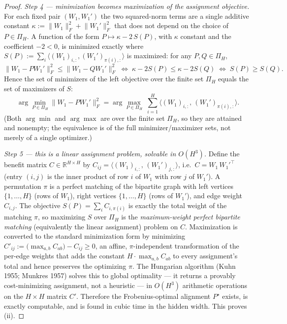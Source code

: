 \documentclass[11pt]{article}
\theoremstyle{definition}
\theoremstyle{remark}
\begin{document}
\begin{proof}
\emph{Step 4 --- minimization becomes maximization of the assignment objective.}
For each fixed pair $(W_1,W_1')$ the two squared-norm terms are a single additive constant
$\kappa:=\lVert W_1\rVert_F^2 + \lVert W_1'\rVert_F^2$ that does not depend on the choice of
$P\in\Pi_H$. A function of the form $P\mapsto \kappa - 2\,S(P)$, with $\kappa$ constant and the
coefficient $-2<0$, is minimized exactly where $S(P):=\sum_i\langle (W_1)_{i,:},(W_1')_{\pi(i),:}
\rangle$ is maximized: for any $P,Q\in\Pi_H$,
\[
\bigl\lVert W_1 - P W_1'\bigr\rVert_F^2 \le \bigl\lVert W_1 - Q W_1'\bigr\rVert_F^2
\;\Longleftrightarrow\;
\kappa - 2S(P)\le \kappa - 2S(Q)
\;\Longleftrightarrow\;
S(P)\ge S(Q).
\]
Hence the set of minimizers of the left objective over the finite set $\Pi_H$ equals the set of
maximizers of $S$:
\[
\arg\min_{P\in\Pi_H}\bigl\lVert W_1 - P W_1'\bigr\rVert_F^2
=\arg\max_{P\in\Pi_H}\;\sum_{i=1}^{H}\bigl\langle (W_1)_{i,:},\,(W_1')_{\pi(i),:}\bigr\rangle .
\]
(Both $\arg\min$ and $\arg\max$ are over the finite set $\Pi_H$, so they are attained and nonempty;
the equivalence is of the full minimizer/maximizer sets, not merely of a single optimizer.)

\emph{Step 5 --- this is a linear assignment problem, solvable in $O(H^3)$.}
Define the benefit matrix $C\in\mathbb{R}^{H\times H}$ by
$C_{ij}=\langle (W_1)_{i,:},\,(W_1')_{j,:}\rangle$, i.e.\ $C=W_1\,W_1'^{\top}$ (entry $(i,j)$ is the
inner product of row $i$ of $W_1$ with row $j$ of $W_1'$). A permutation $\pi$ is a perfect matching
of the bipartite graph with left vertices $\{1,\dots,H\}$ (rows of $W_1$), right vertices
$\{1,\dots,H\}$ (rows of $W_1'$), and edge weight $C_{i,j}$. The objective $S(P)=\sum_{i}C_{i,\pi(i)}$
is exactly the total weight of the matching $\pi$, so maximizing $S$ over $\Pi_H$ is the
\emph{maximum-weight perfect bipartite matching} (equivalently the linear assignment) problem on $C$.
Maximization is converted to the standard minimization form by minimizing
$C'_{ij}:=\bigl(\max_{a,b}C_{ab}\bigr)-C_{ij}\ge 0$, an affine, $\pi$-independent transformation of
the per-edge weights that adds the constant $H\cdot\max_{a,b}C_{ab}$ to every assignment's total and
hence preserves the optimizing $\pi$. The Hungarian algorithm (Kuhn 1955; Munkres 1957) solves this
to global optimality --- it returns a provably cost-minimizing assignment, not a heuristic --- in
$O(H^3)$ arithmetic operations on the $H\times H$ matrix $C'$. Therefore the Frobenius-optimal
alignment $P^{\star}$ exists, is exactly computable, and is found in cubic time in the hidden width.
This proves (ii). \qedhere
\end{proof}
\end{document}
